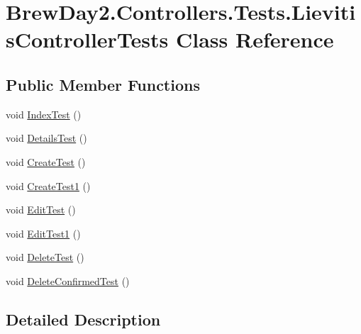 \hypertarget{class_brew_day2_1_1_controllers_1_1_tests_1_1_lievitis_controller_tests}{}\section{Brew\+Day2.\+Controllers.\+Tests.\+Lievitis\+Controller\+Tests Class Reference}
\label{class_brew_day2_1_1_controllers_1_1_tests_1_1_lievitis_controller_tests}
\subsection*{Public Member Functions}
\begin{DoxyCompactItemize}
\item 
void \mbox{\hyperlink{class_brew_day2_1_1_controllers_1_1_tests_1_1_lievitis_controller_tests_ad5a7004521c5ab9d46077846eec18c29}{Index\+Test}} ()
\item 
void \mbox{\hyperlink{class_brew_day2_1_1_controllers_1_1_tests_1_1_lievitis_controller_tests_a98fd5119445aa3e94cafcba1fb5996c7}{Details\+Test}} ()
\item 
void \mbox{\hyperlink{class_brew_day2_1_1_controllers_1_1_tests_1_1_lievitis_controller_tests_af382b6ef67cdd63e969c6ea91a8cbbdf}{Create\+Test}} ()
\item 
void \mbox{\hyperlink{class_brew_day2_1_1_controllers_1_1_tests_1_1_lievitis_controller_tests_aadfd016c5bdfae9f7934aaaab2bc6f22}{Create\+Test1}} ()
\item 
void \mbox{\hyperlink{class_brew_day2_1_1_controllers_1_1_tests_1_1_lievitis_controller_tests_ad4558bfe1a00906a6d47e3099b38b54f}{Edit\+Test}} ()
\item 
void \mbox{\hyperlink{class_brew_day2_1_1_controllers_1_1_tests_1_1_lievitis_controller_tests_a192403b73fca8a864f578364d5c3b894}{Edit\+Test1}} ()
\item 
void \mbox{\hyperlink{class_brew_day2_1_1_controllers_1_1_tests_1_1_lievitis_controller_tests_a21476cb279674ab9f57f1877f702cada}{Delete\+Test}} ()
\item 
void \mbox{\hyperlink{class_brew_day2_1_1_controllers_1_1_tests_1_1_lievitis_controller_tests_afa9ff88c2bbbead6b0afe966cdfbda98}{Delete\+Confirmed\+Test}} ()
\end{DoxyCompactItemize}


\subsection{Detailed Description}


